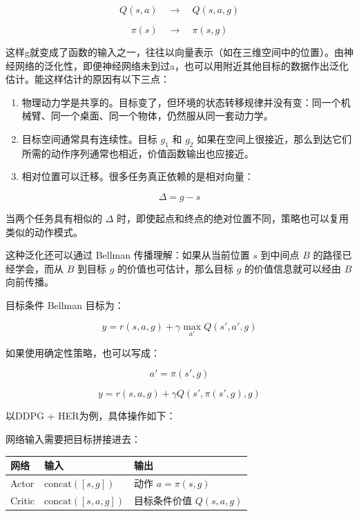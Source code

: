 \[
Q(s,a)\quad\longrightarrow\quad Q(s,a,g)
\]

\[
\pi(s)\quad\longrightarrow\quad \pi(s,g)
\]

这样g就变成了函数的输入之一，往往以向量表示（如在三维空间中的位置）。由神经网络的泛化性，即便神经网络未到过a，也可以用附近其他目标的数据作出泛化估计。能这样估计的原因有以下三点：

\begin{enumerate}
\def\labelenumi{\arabic{enumi}.}
\tightlist
\item
  物理动力学是共享的。目标变了，但环境的状态转移规律并没有变：同一个机械臂、同一个桌面、同一个物体，仍然服从同一套动力学。
\item
  目标空间通常具有连续性。目标 \(g_1\) 和 \(g_2\) 如果在空间上很接近，那么到达它们所需的动作序列通常也相近，价值函数输出也应接近。
\item
{}
  相对位置可以迁移。很多任务真正依赖的是相对向量：
\end{enumerate}

\[
\Delta=g-s
\]

当两个任务具有相似的 \(\Delta\) 时，即使起点和终点的绝对位置不同，策略也可以复用类似的动作模式。

这种泛化还可以通过 Bellman 传播理解：如果从当前位置 \(s\) 到中间点 \(B\) 的路径已经学会，而从 \(B\) 到目标 \(g\) 的价值也可估计，那么目标 \(g\) 的价值信息就可以经由 \(B\) 向前传播。

目标条件 Bellman 目标为：

\[
y
=
r(s,a,g)
+
\gamma
\max_{a'}Q(s',a',g)
\]

如果使用确定性策略，也可以写成：

\[
a'=\pi(s',g)
\]

\[
y
=
r(s,a,g)
+
\gamma Q(s',\pi(s',g),g)
\]

以DDPG + HER为例，具体操作如下：

网络输入需要把目标拼接进去：

\begin{longtable}[]{@{}
  >{\raggedright\arraybackslash}p{}
  >{\raggedright\arraybackslash}p{}
  >{\raggedright\arraybackslash}p{}@{}}
\toprule
网络 & 输入 & 输出 \\
\midrule
\endhead
Actor & \(\mathrm{concat}([s,g])\) & 动作 \(a=\pi(s,g)\) \\
Critic & \(\mathrm{concat}([s,a,g])\) & 目标条件价值 \(Q(s,a,g)\) \\
\bottomrule
\end{longtable}

